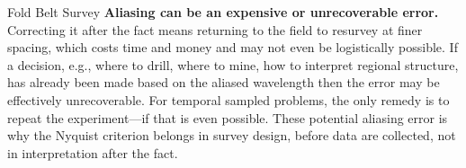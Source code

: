 \begin{activity}{Fold Belt Survey}
\textbf{Aliasing can be an expensive or unrecoverable error.} Correcting it after the fact means returning to the field to resurvey at finer spacing, which costs time and money and may not even be logistically possible. If a decision, e.g., where to drill, where to mine, how to interpret regional structure, has already been made based on the aliased wavelength then the error may be effectively unrecoverable.  For temporal sampled problems, the only remedy is to repeat the experiment---if that is even possible. These potential aliasing error is why the Nyquist criterion belongs in survey design, before data are collected, not in interpretation after the fact.

\end{activity}
